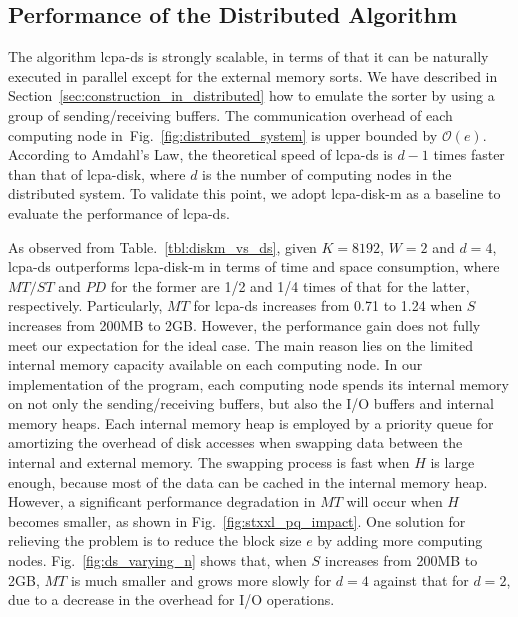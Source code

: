 \documentclass[10pt,journal,letterpaper,compsoc]{IEEEtran}
\begin{document}
\begin{CJK*}{GBK}{song}
\subsection{Performance of the Distributed Algorithm}

The algorithm lcpa-ds is strongly scalable, in terms of that it can be naturally executed in parallel except for the external memory sorts. We have described in Section~\ref{sec:construction_in_distributed} how to emulate the sorter by using a group of sending/receiving buffers. The communication overhead of each computing node in~Fig.~\ref{fig:distributed_system} is upper bounded by $\mathcal{O}(e)$. According to Amdahl's Law, the theoretical speed of lcpa-ds is $d-1$ times faster than that of lcpa-disk, where $d$ is the number of computing nodes in the distributed system. To validate this point, we adopt lcpa-disk-m as a baseline to evaluate the performance of lcpa-ds.

As observed from Table.~\ref{tbl:diskm_vs_ds}, given $K=8192$, $W=2$ and $d=4$, lcpa-ds outperforms lcpa-disk-m in terms of time and space consumption, where $MT/ST$ and $PD$ for the former are 1/2 and 1/4 times of that for the latter, respectively. Particularly, $MT$ for lcpa-ds increases from 0.71 to 1.24 when $S$ increases from 200MB to 2GB. However, the performance gain does not fully meet our expectation for the ideal case. The main reason lies on the limited internal memory capacity available on each computing node. In our implementation of the program, each computing node spends its internal memory on not only the sending/receiving buffers, but also the I/O buffers and internal memory heaps. Each internal memory heap is employed by a priority queue for amortizing the overhead of disk accesses when swapping data between the internal and external memory. The swapping process is fast when $H$ is large enough, because most of the data can be cached in the internal memory heap. However, a significant performance degradation in $MT$ will occur when $H$ becomes smaller, as shown in Fig.~\ref{fig:stxxl_pq_impact}. One solution for relieving the problem is to reduce the block size $e$ by adding more computing nodes. Fig.~\ref{fig:ds_varying_n} shows that, when $S$ increases from 200MB to 2GB, $MT$ is much smaller and grows more slowly for $d = 4$ against that for $d = 2$, due to a decrease in the overhead for I/O operations.




\end{CJK*}
\end{document}
